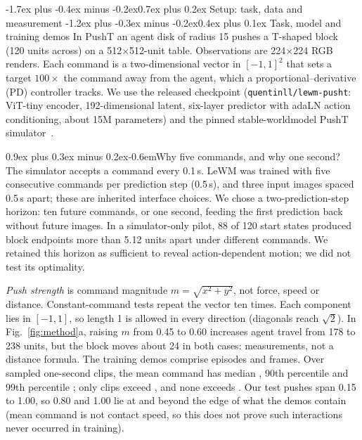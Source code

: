 \documentclass[10pt,twocolumn,a4paper]{article}
\makeatletter
\renewcommand\section{\@startsection{section}{1}{\z@}%
  {-1.7ex plus -0.4ex minus -0.2ex}{0.7ex plus 0.2ex}%
  {\normalfont\large\bfseries\color{accent}}}
\renewcommand\subsection{\@startsection{subsection}{2}{\z@}%
  {-1.2ex plus -0.3ex minus -0.2ex}{0.4ex plus 0.1ex}%
  {\normalfont\normalsize\bfseries\color{accent}}}
\renewcommand\paragraph{\@startsection{paragraph}{4}{\z@}%
  {0.9ex plus 0.3ex minus 0.2ex}{-0.6em}{\normalfont\normalsize\bfseries}}
\makeatother
\begin{document}
\section{Setup: task, data and measurement}
\nopagebreak[4]
\subsection{Task, model and training demos}\label{sec:task}
In PushT an agent disk of radius 15 pushes a T-shaped block (120 units across) on a
512$\times$512-unit table. Observations are 224$\times$224 RGB renders. Each command is a
two-dimensional vector in $[-1,1]^2$ that sets a target $100\times$ the command away from
the agent, which a proportional--derivative (PD) controller tracks. We use
the released checkpoint (\texttt{quentinll/lewm-pusht}: ViT-tiny encoder, 192-dimensional
latent, six-layer predictor with adaLN action conditioning, about 15M parameters) and the
pinned stable-worldmodel PushT simulator~\cite{maes2026swm}.

\paragraph{Why five commands, and why one second?} The simulator accepts a command every
0.1\,s. LeWM was trained with five consecutive commands per prediction step (0.5\,s),
and three input images spaced 0.5\,s apart; these are inherited interface choices.
We chose a two-prediction-step horizon: ten future commands, or one second, feeding the
first prediction back without future images. In a simulator-only pilot, 88 of 120 start
states produced block endpoints more than 5.12 units apart under different commands.
We retained this horizon as sufficient to reveal action-dependent motion;
we did not test its optimality.

\emph{Push strength} is command magnitude $m=\sqrt{x^2+y^2}$, not force, speed or
distance. Constant-command tests repeat the vector ten times. Each component lies
in $[-1,1]$, so length 1 is allowed in every direction (diagonals reach $\sqrt2$).
In Fig.~\ref{fig:method}a, raising $m$ from 0.45 to 0.60 increases agent travel
from 178 to 238 units, but the block moves about 24 in both cases: measurements,
not a distance formula.
The training demos comprise \demoEpisodes{} episodes and
\demoFrames{} frames. Over \demoWindows{} sampled one-second clips, the mean command has
median \demoCommandMedian, 90th percentile \demoCommandNinety{} and 99th percentile
\demoCommandNinetynine; only \supMapAbove{} clips exceed \supMapPninetynine, and none exceeds
\supMapMax. Our test pushes span 0.15 to 1.00, so 0.80 and 1.00 lie at and beyond the edge
of what the demos contain (mean command is not contact speed, so this does not prove such
interactions never occurred in training).
\end{document}
